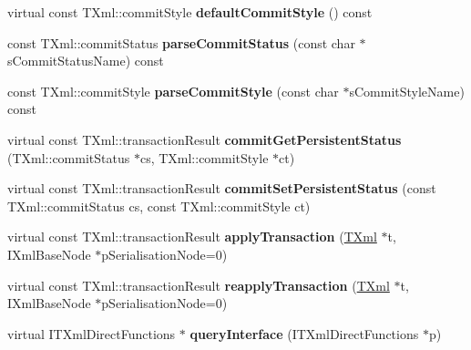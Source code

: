 \begin{DoxyCompactItemize}
\item 
\hypertarget{classgeneral__server_1_1TXmlProcessor_a7b2daa293abdc7892851c84d22da63a1}{virtual const \-T\-Xml\-::commit\-Style {\bfseries default\-Commit\-Style} () const }\label{classgeneral__server_1_1TXmlProcessor_a7b2daa293abdc7892851c84d22da63a1}

\item 
\hypertarget{classgeneral__server_1_1TXmlProcessor_ae82c7074432dd0df432a99e20e71c1f3}{const \-T\-Xml\-::commit\-Status {\bfseries parse\-Commit\-Status} (const char $\ast$s\-Commit\-Status\-Name) const }\label{classgeneral__server_1_1TXmlProcessor_ae82c7074432dd0df432a99e20e71c1f3}

\item 
\hypertarget{classgeneral__server_1_1TXmlProcessor_a783543bfe06016c7d164b749b421a72a}{const \-T\-Xml\-::commit\-Style {\bfseries parse\-Commit\-Style} (const char $\ast$s\-Commit\-Style\-Name) const }\label{classgeneral__server_1_1TXmlProcessor_a783543bfe06016c7d164b749b421a72a}

\item 
\hypertarget{classgeneral__server_1_1TXmlProcessor_a9c55da3e65484fdf462fa8f766b78a6d}{virtual const \*
\-T\-Xml\-::transaction\-Result {\bfseries commit\-Get\-Persistent\-Status} (\-T\-Xml\-::commit\-Status $\ast$cs, \-T\-Xml\-::commit\-Style $\ast$ct)}\label{classgeneral__server_1_1TXmlProcessor_a9c55da3e65484fdf462fa8f766b78a6d}

\item 
\hypertarget{classgeneral__server_1_1TXmlProcessor_aa4e97e8c0cf64a6cfcaf1564d22430d2}{virtual const \*
\-T\-Xml\-::transaction\-Result {\bfseries commit\-Set\-Persistent\-Status} (const \-T\-Xml\-::commit\-Status cs, const \-T\-Xml\-::commit\-Style ct)}\label{classgeneral__server_1_1TXmlProcessor_aa4e97e8c0cf64a6cfcaf1564d22430d2}

\item 
\hypertarget{classgeneral__server_1_1TXmlProcessor_aed27d7e87ecae1e8a741790b55bff923}{virtual const \*
\-T\-Xml\-::transaction\-Result {\bfseries apply\-Transaction} (\hyperlink{classgeneral__server_1_1TXml}{\-T\-Xml} $\ast$t, \-I\-Xml\-Base\-Node $\ast$p\-Serialisation\-Node=0)}\label{classgeneral__server_1_1TXmlProcessor_aed27d7e87ecae1e8a741790b55bff923}

\item 
\hypertarget{classgeneral__server_1_1TXmlProcessor_ae5085c8d75e72a1b211e9c3cb000c9a1}{virtual const \*
\-T\-Xml\-::transaction\-Result {\bfseries reapply\-Transaction} (\hyperlink{classgeneral__server_1_1TXml}{\-T\-Xml} $\ast$t, \-I\-Xml\-Base\-Node $\ast$p\-Serialisation\-Node=0)}\label{classgeneral__server_1_1TXmlProcessor_ae5085c8d75e72a1b211e9c3cb000c9a1}

\item 
\hypertarget{classgeneral__server_1_1TXmlProcessor_ac045f21a006bb1c0f186e2cfb7d43eb6}{virtual \-I\-T\-Xml\-Direct\-Functions $\ast$ {\bfseries query\-Interface} (\-I\-T\-Xml\-Direct\-Functions $\ast$p)}\label{classgeneral__server_1_1TXmlProcessor_ac045f21a006bb1c0f186e2cfb7d43eb6}

\end{DoxyCompactItemize}
